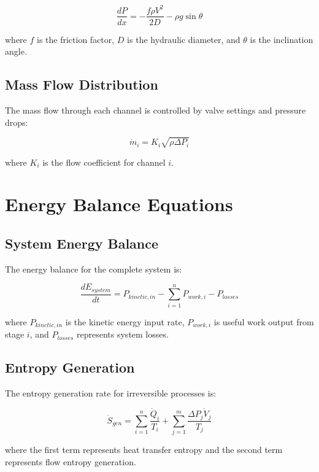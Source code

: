 \documentclass[12pt,a4paper]{article}
\begin{document}
\begin{equation}
\frac{dP}{dx} = -\frac{f \rho V^2}{2D} - \rho g \sin\theta
\end{equation}

where $f$ is the friction factor, $D$ is the hydraulic diameter, and $\theta$ is the inclination angle.

\subsection{Mass Flow Distribution}

The mass flow through each channel is controlled by valve settings and pressure drops:

\begin{equation}
\dot{m}_i = K_i \sqrt{\rho \Delta P_i}
\end{equation}

where $K_i$ is the flow coefficient for channel $i$.

\section{Energy Balance Equations}

\subsection{System Energy Balance}

The energy balance for the complete system is:

\begin{equation}
\frac{dE_{system}}{dt} = P_{kinetic,in} - \sum_{i=1}^{n} P_{work,i} - P_{losses}
\end{equation}

where $P_{kinetic,in}$ is the kinetic energy input rate, $P_{work,i}$ is useful work output from stage $i$, and $P_{losses}$ represents system losses.

\subsection{Entropy Generation}

The entropy generation rate for irreversible processes is:

\begin{equation}
\dot{S}_{gen} = \sum_{i=1}^{n} \frac{\dot{Q}_i}{T_i} + \sum_{j=1}^{m} \frac{\Delta P_j \dot{V}_j}{T_j}
\end{equation}

where the first term represents heat transfer entropy and the second term represents flow entropy generation.
\end{document}
